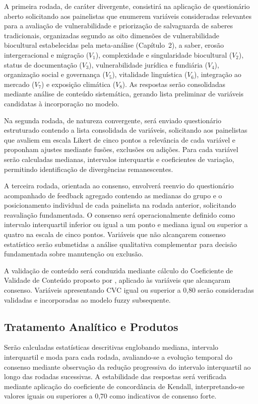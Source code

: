 A primeira rodada, de caráter divergente, consistirá na aplicação de questionário aberto solicitando aos painelistas que enumerem variáveis consideradas relevantes para a avaliação de vulnerabilidade e priorização de salvaguarda de saberes tradicionais, organizadas segundo as oito dimensões de vulnerabilidade biocultural estabelecidas pela meta-análise (Capítulo~2), a saber, erosão intergeracional e migração ($V_1$), complexidade e singularidade biocultural ($V_2$), status de documentação ($V_3$), vulnerabilidade jurídica e fundiária ($V_4$), organização social e governança ($V_5$), vitalidade linguística ($V_6$), integração ao mercado ($V_7$) e exposição climática ($V_8$). As respostas serão consolidadas mediante análise de conteúdo sistemática, gerando lista preliminar de variáveis candidatas à incorporação no modelo.

Na segunda rodada, de natureza convergente, será enviado questionário estruturado contendo a lista consolidada de variáveis, solicitando aos painelistas que avaliem em escala Likert de cinco pontos a relevância de cada variável e proponham ajustes mediante fusões, exclusões ou adições. Para cada variável serão calculadas medianas, intervalos interquartis e coeficientes de variação, permitindo identificação de divergências remanescentes.

A terceira rodada, orientada ao consenso, envolverá reenvio do questionário acompanhado de feedback agregado contendo as medianas do grupo e o posicionamento individual de cada painelista na rodada anterior, solicitando reavaliação fundamentada. O consenso será operacionalmente definido como intervalo interquartil inferior ou igual a um ponto e mediana igual ou superior a quatro na escala de cinco pontos. Variáveis que não alcançarem consenso estatístico serão submetidas a análise qualitativa complementar para decisão fundamentada sobre manutenção ou exclusão.

A validação de conteúdo será conduzida mediante cálculo do Coeficiente de Validade de Conteúdo proposto por , aplicado às variáveis que alcançaram consenso. Variáveis apresentando CVC igual ou superior a 0,80 serão consideradas validadas e incorporadas ao modelo fuzzy subsequente.

\subsection{Tratamento Analítico e Produtos}

Serão calculadas estatísticas descritivas englobando mediana, intervalo interquartil e moda para cada rodada, avaliando-se a evolução temporal do consenso mediante observação da redução progressiva do intervalo interquartil ao longo das rodadas sucessivas. A estabilidade das respostas será verificada mediante aplicação do coeficiente de concordância de Kendall, interpretando-se valores iguais ou superiores a 0,70 como indicativos de consenso forte.

